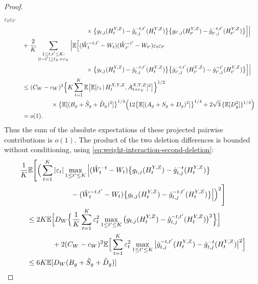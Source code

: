 \documentclass[12pt]{article}
\def\E{\mathbb{E}}
\newcommand\given{\,|\,}
\numberwithin{equation}{section}
\begin{document}
\begin{proof}
\begin{align}
\varepsilon_t\varepsilon_{t'}\notag\\*
&\hspace{40mm}{}\times
\big\{g_{t,j}(H_t^{Y,Z})
-\hat g_{t,j}^{-t,t'}(H_t^{Y,Z})\big\}
\big\{g_{t',j}(H_{t'}^{Y,Z})
-\hat g_{t',j}^{-t,t'}(H_{t'}^{Y,Z})\big\}
\Big]\Big|\notag\\
&\quad{}+\frac2K\sum_{\substack{1\leq t,t'\leq K:\\
|t-t'|\geq l_K+r_K}}
\Big|\E\Big[
(\hat W_t^{-t,t'}-W_t)(\hat W_{t'}^{-t'}-W_{t'})
\varepsilon_t\varepsilon_{t'}\notag\\*
&\hspace{40mm}{}\times
\big\{g_{t,j}(H_t^{Y,Z})
-\hat g_{t,j}^{-t,t'}(H_t^{Y,Z})\big\}
\big\{\hat g_{t',j}^{-t,t'}(H_{t'}^{Y,Z})
-\hat g_{t',j}^{-t'}(H_{t'}^{Y,Z})\big\}
\Big]\Big|\notag\\
&\quad\leq(C_W-c_W)^2
\Big\{K\sum_{t=1}^K
\E\big[\E[\varepsilon_t\given
H_t^{X,Y,Z},A_{t+r_K}^{X,Y,Z}]^2\big]\Big\}^{1/2}
\notag\\*
&\hspace{20mm}{}\times
\big\{\E[(B_g+\tilde S_g+\tilde D_g)^2]\big\}^{1/4}
\Big(
12\big\{\E[(A_g+S_g+D_g)^2]\big\}^{1/4}
+2\sqrt3\,\{\E[D_g^2]\}^{1/4}
\Big)\notag\\
&\quad=o(1).
\label{eq:weight-interaction-separated-bound}
\end{align}
Thus the sum of the absolute expectations of these projected
pairwise contributions is \(o(1)\).
The product of the two deletion differences is bounded without
conditioning, using \eqref{eq:weight-interaction-second-deletion}:
\begin{align}
&\frac1K\E\Bigg[
\Big(\sum_{t=1}^K|\varepsilon_t|
\max_{1\leq t'\leq K}\Big|
(\hat W_t^{-t}-W_t)
\big\{g_{t,j}(H_t^{Y,Z})
-\hat g_{t,j}^{-t}(H_t^{Y,Z})\big\}\notag\\*
&\hspace{25mm}{}-
(\hat W_t^{-t,t'}-W_t)
\big\{g_{t,j}(H_t^{Y,Z})
-\hat g_{t,j}^{-t,t'}(H_t^{Y,Z})\big\}
\Big|\Big)^2
\Bigg]\notag\\
&\quad\leq2K\E\Big[
D_W\Big\{\frac1K\sum_{t=1}^K\varepsilon_t^2
\max_{1\leq t'\leq K}
\big(g_{t,j}(H_t^{Y,Z})
-\hat g_{t,j}^{-t,t'}(H_t^{Y,Z})\big)^2\Big\}
\Big]\notag\\*
&\hspace{16mm}{}+
2(C_W-c_W)^2
\E\Big[
\sum_{t=1}^K\varepsilon_t^2
\max_{1\leq t'\leq K}
\big|\hat g_{t,j}^{-t,t'}(H_t^{Y,Z})
-\hat g_{t,j}^{-t}(H_t^{Y,Z})\big|^2
\Big]\notag\\
&\quad\leq
6K\E[D_W(B_g+\tilde S_g+\tilde D_g)]

\end{align}
\end{proof}
\end{document}
